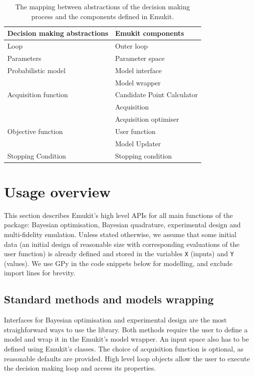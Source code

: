 \begin{table}
    \setlength{\DUtablewidth}{\tablewidth}
    \begin{longtable}[c]{p{0.4\DUtablewidth}p{0.4\DUtablewidth}}
        \toprule
        \textbf{Decision making abstractions} & \textbf{Emukit components} \\
        \midrule
        \endfirsthead
        Loop & Outer loop \\
        \midrule
        Parameters & Parameter space \\
        Probabilistic model & Model interface \\
        & Model wrapper \\
        \midrule
        Acquisition function & Candidate Point Calculator \\
        & Acquisition \\
        & Acquisition optimiser \\
        \midrule
        Objective function & User function \\
        & Model Updater \\
        \midrule
        Stopping Condition & Stopping condition \\
        \bottomrule
    \end{longtable}
    \caption{The mapping between abstractions of the decision making process and the components defined in Emukit.}
    \label{table:abstraction_mapping}
\end{table}

\section{Usage overview}\label{sec:usage}
This section describes Emukit's high level APIs for all main functions of the package: Bayesian optimisation, Bayesian quadrature, experimental design and multi-fidelity emulation. Unless stated otherwise, we assume that some initial data (an initial design of reasonable size with corresponding evaluations of the user function) is already defined and stored in the variables \texttt{X} (inputs) and \texttt{Y} (values). We use GPy \cite{gpy2014} in the code snippets below for modelling, and exclude import lines for brevity.

\subsection{Standard methods and models wrapping}

Interfaces for Bayesian optimisation and experimental design are the most straighforward ways to use the library. Both methods require the user to define a model and wrap it in the Emukit's model wrapper. An input space also has to be defined using Emukit's classes. The choice of acquisition function is optional, as reasonable defaults are provided. High level loop objects allow the user to execute the decision making loop and access its properties.

